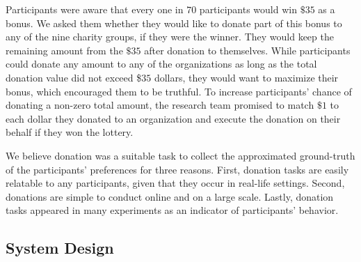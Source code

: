 Participants were aware that every one in $70$ participants would win $\$35$ as a bonus. We asked them whether they would like to donate part of this bonus to any of the nine charity groups, if they were the winner. They would keep the remaining amount from the $\$35$ after donation to themselves. While participants could donate any amount to any of the organizations as long as the total donation value did not exceed \$$35$ dollars, they would want to maximize their bonus, which encouraged them to be truthful. To increase participants' chance of donating a non-zero total amount, the research team promised to match $\$1$ to each dollar they donated to an organization and execute the donation on their behalf if they won the lottery. 


We believe donation was a suitable task to collect the approximated ground-truth of the participants' preferences for three reasons. First, donation tasks are easily relatable to any participants, given that they occur in real-life settings. Second, donations are simple to conduct online and on a large scale. Lastly, donation tasks appeared in many experiments \cite{Xiao2019, benz2008people, gendall2010effect} as an indicator of participants' behavior. 



\subsection{System Design}

